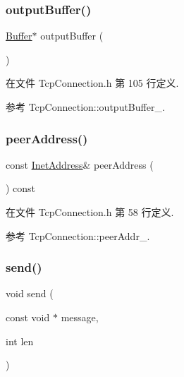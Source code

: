 \subsubsection{\texorpdfstring{output\+Buffer()}{outputBuffer()}}
{\footnotesize\ttfamily \hyperlink{classmuduo_1_1net_1_1Buffer}{Buffer}$\ast$ output\+Buffer (\begin{DoxyParamCaption}{ }\end{DoxyParamCaption})\hspace{0.3cm}{\ttfamily [inline]}}



在文件 Tcp\+Connection.\+h 第 105 行定义.



参考 Tcp\+Connection\+::output\+Buffer\+\_\+.

\mbox{\label{classmuduo_1_1net_1_1TcpConnection_a4fcf3842d90c471bb6939afd04bba128}} 
\subsubsection{\texorpdfstring{peer\+Address()}{peerAddress()}}
{\footnotesize\ttfamily const \hyperlink{classmuduo_1_1net_1_1InetAddress}{Inet\+Address}\& peer\+Address (\begin{DoxyParamCaption}{ }\end{DoxyParamCaption}) const\hspace{0.3cm}{\ttfamily [inline]}}



在文件 Tcp\+Connection.\+h 第 58 行定义.



参考 Tcp\+Connection\+::peer\+Addr\+\_\+.

\mbox{\label{classmuduo_1_1net_1_1TcpConnection_a9c8ef4c9c94e6ccd8cb7233d6ecb9834}} 
\subsubsection{\texorpdfstring{send()}{send()}\hspace{0.1cm}{\footnotesize\ttfamily [1/3]}}
{\footnotesize\ttfamily void send (\begin{DoxyParamCaption}\item[{const void $\ast$}]{message,  }\item[{int}]{len }\end{DoxyParamCaption})}



